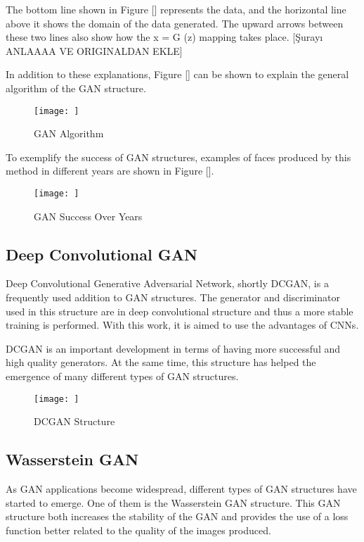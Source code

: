 The bottom line shown in Figure [] represents the data, and the horizontal line above it shows the domain of the data generated. The upward arrows between these two lines also show how the x = G (z) mapping takes place. [Şurayı ANLAAAA VE ORIGINALDAN EKLE]

In addition to these explanations, Figure [] can be shown to explain the general algorithm of the GAN structure.

\begin{figure}[h]
    \centering
    \texttt{[image: ]}
    \caption{GAN Algorithm}
    \label{fig:my_label}
\end{figure}

To exemplify the success of GAN structures, examples of faces produced by this method in different years are shown in Figure [].

\begin{figure}[h]
    \centering
    \texttt{[image: ]}
    \caption{GAN Success Over Years}
    \label{fig:my_label}
\end{figure}

\subsection{Deep Convolutional GAN}

Deep Convolutional Generative Adversarial Network, shortly DCGAN, is a frequently used addition to GAN structures. The generator and discriminator used in this structure are in deep convolutional structure and thus a more stable training is performed. With this work, it is aimed to use the advantages of CNNs.

DCGAN is an important development in terms of having more successful and high quality generators. At the same time, this structure has helped the emergence of many different types of GAN structures.

\begin{figure}[h]
    \centering
    \texttt{[image: ]}
    \caption{DCGAN Structure}
    \label{fig:my_label}
\end{figure}

\subsection{Wasserstein GAN}

As GAN applications become widespread, different types of GAN structures have started to emerge. One of them is the Wasserstein GAN structure. This GAN structure both increases the stability of the GAN and provides the use of a loss function better related to the quality of the images produced.

